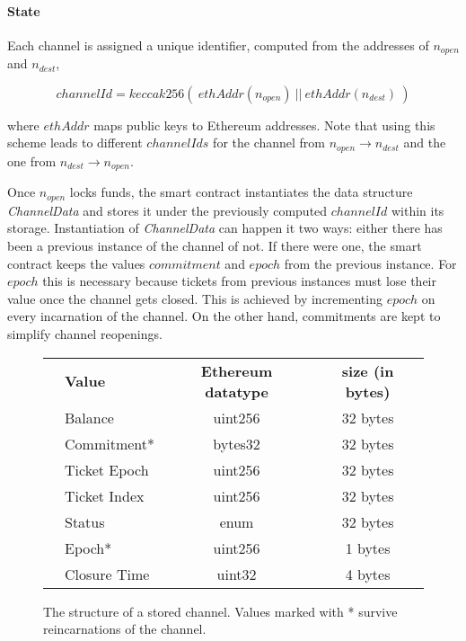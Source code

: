 \paragraph{State}

Each channel is assigned a unique identifier, computed from the addresses of $n_{open}$ and $n_{dest}$,

$$ channelId = keccak256 (\ ethAddr(n_{open}) \ || \ ethAddr(n_{dest}) \ ) $$

where $ethAddr$ maps public keys to Ethereum addresses. Note that using this scheme leads to different $channelIds$ for the channel from $n_{open} \rightarrow n_{dest}$ and the one from $n_{dest} \rightarrow n_{open}$.

Once $n_{open}$ locks funds, the smart contract instantiates the data structure \textit{ChannelData} and stores it under the previously computed $channelId$ within its storage. Instantiation of \textit{ChannelData} can happen it two ways: either there has been a previous instance of the channel of not. If there were one, the smart contract keeps the values $commitment$ and $epoch$ from the previous instance. For $epoch$ this is necessary because tickets from previous instances must lose their value once the channel gets closed. This is achieved by incrementing $epoch$ on every incarnation of the channel. On the other hand, commitments are kept to simplify channel reopenings.

\begin{figure}[H]
    \centering
    \begin{tabular}{c|l|c|c|}
        \cline{2-4}
                                                     & \textbf{Value} & \textbf{Ethereum datatype} & \textbf{size (in bytes)} \\
        \cline{2-4}
        \noalign{\smallskip}
        \cline{2-4}
        \multirow{7}{*}{\rotatebox{90}{ChannelData}} & Balance        & uint256                    & 32 bytes                 \\
                                                     & Commitment*    & bytes32                    & 32 bytes                 \\
                                                     & Ticket Epoch   & uint256                    & 32 bytes                 \\
                                                     & Ticket Index   & uint256                    & 32 bytes                 \\
                                                     & Status         & enum                       & 32 bytes                 \\
                                                     & Epoch*         & uint256                    & 1 bytes                  \\
                                                     & Closure Time   & uint32                     & 4 bytes                  \\
        \cline{2-4}
    \end{tabular}
    \caption{The structure of a stored channel. Values marked with * survive reincarnations of the channel.}
    \label{fig:channeldata}
\end{figure}

